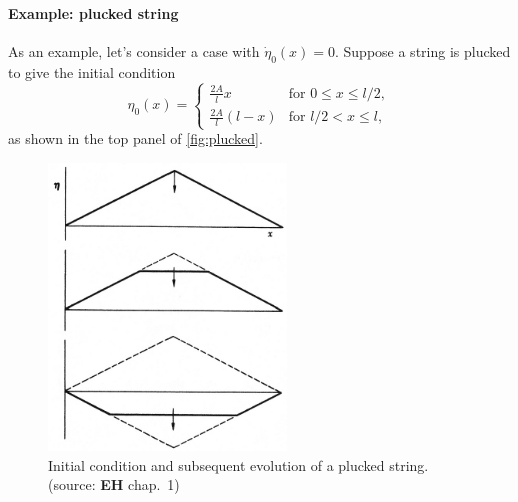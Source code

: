 \documentclass[11pt,twoside,a4paper]{article}
\begin{document}
\paragraph{Example: plucked string}
As an example, let's consider a case with $\dot{\eta}_0(x)=0$.
Suppose a string is plucked to give the initial condition
\begin{equation}
  \label{eq:pluckedIC}
  \eta_0(x) =
  \begin{cases}
    \frac{2A}{l}x & \text{for $0\le x\le l/2$},\\
    \frac{2A}{l}(l-x) & \text{for $l/2 < x\le l$},
  \end{cases}
\end{equation}
as shown in the top panel of \autoref{fig:plucked}.

\begin{figure}
  \includegraphics[height=3in]{../figs/L20/PluckedString}
  \caption{Initial condition and subsequent evolution of a plucked
    string.  (source: \textbf{EH} chap.~1)\vspace{1in}}
  \label{fig:plucked}
\end{figure}
\end{document}
